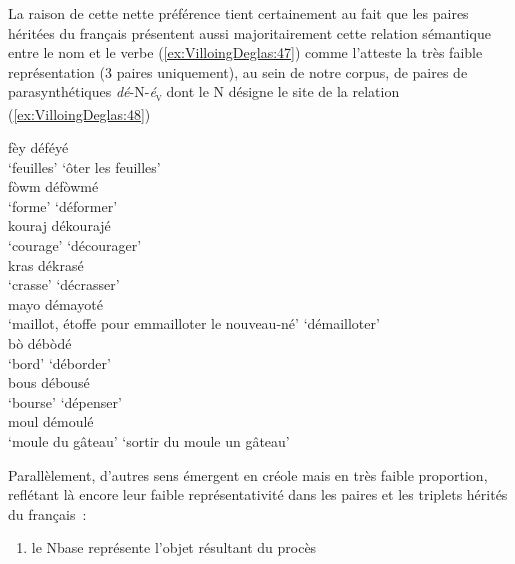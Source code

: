 \documentclass[output=paper]{langsci/langscibook}
\begin{document}
La raison de cette nette préférence tient certainement au fait que les
paires héritées du français présentent aussi majoritairement cette
relation sémantique entre le nom et le verbe (\ref{ex:VilloingDeglas:47}) comme l'atteste la
très faible représentation (3 paires uniquement), au sein de notre
corpus, de paires de parasynthétiques \emph{dé}-N-\emph{é}\textsubscript{\textsc{v}} dont le N
désigne le site de la relation (\ref{ex:VilloingDeglas:48})

\ea \label{ex:VilloingDeglas:47}
      \ea \gll fèy \textrightarrow{~} déféyé\\
        {`feuilles'} {} {`ôter les feuilles'}\\
      \ex \gll  fòwm \textrightarrow{~} défòwmé\\
        {`forme'} {} {`déformer'}\\
      \ex \gll  kouraj \textrightarrow{~} dékourajé\\
        {`courage'} {} {`décourager'}\\
      \ex \gll  kras \textrightarrow{~} dékrasé\\
        {`crasse'} {} {`décrasser'}\\
      \ex \gll  mayo \textrightarrow{~} démayoté\\
        {`maillot, étoffe pour emmailloter le nouveau-né'} {} {`démailloter'}\\
      \z
\ex \label{ex:VilloingDeglas:48}
      \ea \gll bò \textrightarrow{~} débòdé\\
        {`bord'} {} {`déborder'}\\
      \ex \gll  bous \textrightarrow{~} débousé\\
        {`bourse'} {} {`dépenser'}\\
      \ex \gll  moul \textrightarrow{~} démoulé\\
        {`moule du gâteau'} {} {`sortir du moule un gâteau'}\\
\z\z

\label{propriétés-sémantiques-autres-sens-minoritaires}

Parallèlement, d'autres sens émergent en créole mais en très faible
proportion, reflétant là encore leur faible représentativité dans les
paires et les triplets hérités du français~:

\begin{enumerate}\def\labelenumi{(\roman{enumi})}
\item
  le Nbase représente l'objet résultant du procès
\end{enumerate}
\end{document}
